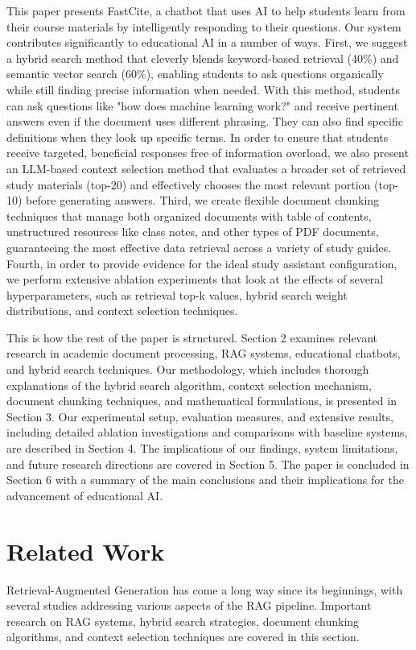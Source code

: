 \documentclass[runningheads]{llncs}
\begin{document}
This paper presents FastCite, a chatbot that uses AI to help students learn from their course materials by intelligently responding to their questions. Our system contributes significantly to educational AI in a number of ways. First, we suggest a hybrid search method that cleverly blends keyword-based retrieval (40\%) and semantic vector search (60\%), enabling students to ask questions organically while still finding precise information when needed. With this method, students can ask questions like "how does machine learning work?" and receive pertinent answers even if the document uses different phrasing. They can also find specific definitions when they look up specific terms. In order to ensure that students receive targeted, beneficial responses free of information overload, we also present an LLM-based context selection method that evaluates a broader set of retrieved study materials (top-20) and effectively chooses the most relevant portion (top-10) before generating answers. Third, we create flexible document chunking techniques that manage both organized documents with table of contents, unstructured resources like class notes, and other types of PDF documents, guaranteeing the most effective data retrieval across a variety of study guides. Fourth, in order to provide evidence for the ideal study assistant configuration, we perform extensive ablation experiments that look at the effects of several hyperparameters, such as retrieval top-k values, hybrid search weight distributions, and context selection techniques.

This is how the rest of the paper is structured. Section 2 examines relevant research in academic document processing, RAG systems, educational chatbots, and hybrid search techniques. Our methodology, which includes thorough explanations of the hybrid search algorithm, context selection mechanism, document chunking techniques, and mathematical formulations, is presented in Section 3. Our experimental setup, evaluation measures, and extensive results, including detailed ablation investigations and comparisons with baseline systems, are described in Section 4. The implications of our findings, system limitations, and future research directions are covered in Section 5. The paper is concluded in Section 6 with a summary of the main conclusions and their implications for the advancement of educational AI.
%
%
\section{Related Work}
Retrieval-Augmented Generation has come a long way since its beginnings, with several studies addressing various aspects of the RAG pipeline. Important research on RAG systems, hybrid search strategies, document chunking algorithms, and context selection techniques are covered in this section.
\end{document}
